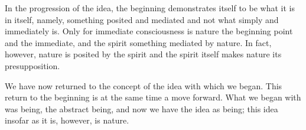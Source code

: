     In the progression of the idea, the beginning demonstrates itself to be
    what it is in itself, namely,
    something posited and mediated and not what simply and immediately is.
    Only for immediate consciousness is nature the beginning point and the immediate,
    and the spirit something mediated by nature.
    In fact, however, nature is posited by the spirit and
    the spirit itself makes nature its presupposition.

We have now returned to the concept of the idea with which we began.
This return to the beginning is at the same time a move forward.
What we began with was being, the abstract being,
and now we have the idea as being;
this idea insofar as it is, however, is nature.
